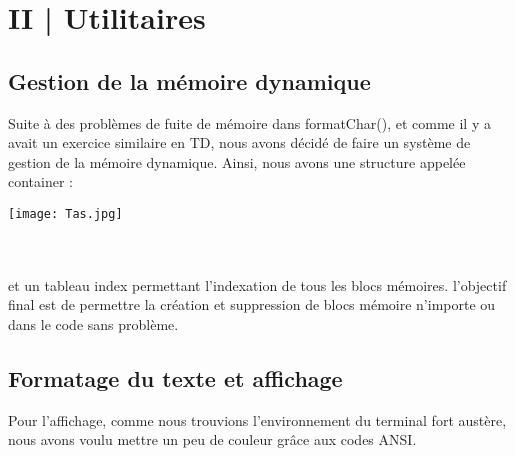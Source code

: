 \documentclass{report}
\begin{document}
\section*{II | Utilitaires}
\subsection*{Gestion de la mémoire dynamique}
Suite à des problèmes de fuite de mémoire dans formatChar(), et comme il y a avait un exercice similaire en TD, nous avons décidé de faire un système de gestion de la mémoire dynamique.
Ainsi, nous avons une structure appelée container :
\\
\begin{center}
\texttt{[image: Tas.jpg]} 
\end{center}
\\
\\
et un tableau index permettant l'indexation de tous les blocs mémoires. l'objectif final est de permettre la création et suppression de blocs mémoire n'importe ou dans le code sans problème.

\subsection*{Formatage du texte et affichage}
Pour l'affichage, comme nous trouvions l'environnement du terminal fort austère, nous avons voulu mettre un peu de couleur grâce aux codes ANSI.
\end{document}
